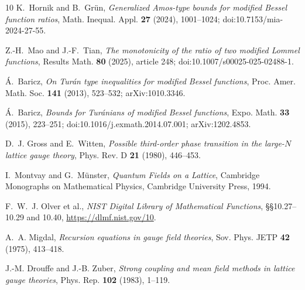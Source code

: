 \documentclass[11pt]{article}
\theoremstyle{remark}
\begin{document}
\begin{thebibliography}{10}
K.~Hornik and B.~Gr\"un,
\emph{Generalized Amos-type bounds for modified Bessel function ratios},
Math. Inequal. Appl. \textbf{27} (2024), 1001--1024;
doi:10.7153/mia-2024-27-55.

Z.-H.~Mao and J.-F.~Tian,
\emph{The monotonicity of the ratio of two modified Lommel functions},
Results Math. \textbf{80} (2025), article 248;
doi:10.1007/s00025-025-02488-1.

\'A.~Baricz,
\emph{On Tur\'an type inequalities for modified Bessel functions},
Proc. Amer. Math. Soc. \textbf{141} (2013), 523--532; arXiv:1010.3346.

\'A.~Baricz,
\emph{Bounds for Tur\'anians of modified Bessel functions},
Expo. Math. \textbf{33} (2015), 223--251;
doi:10.1016/j.exmath.2014.07.001; arXiv:1202.4853.

D.~J. Gross and E.~Witten,
\emph{Possible third-order phase transition in the large-$N$ lattice
gauge theory},
Phys. Rev. D \textbf{21} (1980), 446--453.

I.~Montvay and G.~M\"unster,
\emph{Quantum Fields on a Lattice},
Cambridge Monographs on Mathematical Physics, Cambridge University
Press, 1994.

F.~W.~J. Olver et al.,
\emph{NIST Digital Library of Mathematical Functions},
\S\S10.27--10.29 and 10.40, \url{https://dlmf.nist.gov/10}.

A.~A. Migdal,
\emph{Recursion equations in gauge field theories},
Sov. Phys. JETP \textbf{42} (1975), 413--418.

J.-M. Drouffe and J.-B. Zuber,
\emph{Strong coupling and mean field methods in lattice gauge theories},
Phys. Rep. \textbf{102} (1983), 1--119.

\end{thebibliography}
\end{document}
